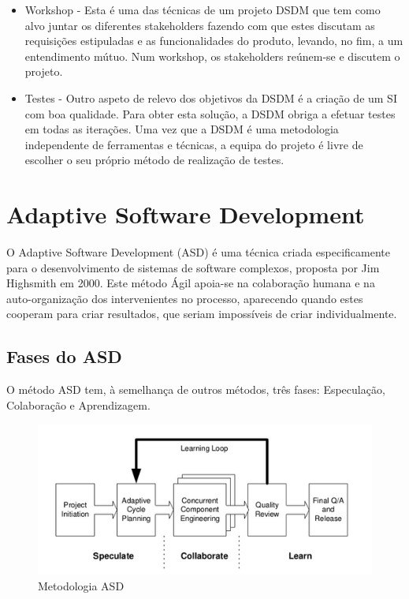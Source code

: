 \begin{itemize}
    \item Workshop - Esta é uma das técnicas de um projeto DSDM que tem como alvo juntar os diferentes stakeholders fazendo com que estes discutam as requisições estipuladas e as funcionalidades do produto, levando, no fim, a um entendimento mútuo. Num workshop, os stakeholders reúnem-se e discutem o projeto.
    \item Testes - Outro aspeto de relevo dos objetivos da DSDM é a criação de um SI com boa qualidade. Para obter esta solução, a DSDM obriga a efetuar testes em todas as iterações. Uma vez que a DSDM é uma metodologia independente de ferramentas e técnicas, a equipa do projeto é livre de escolher o seu próprio método de realização de testes.
    
\end{itemize}

\newpage

\section{Adaptive Software Development}


O Adaptive Software Development (ASD) é uma técnica criada especificamente para o desenvolvimento de sistemas de software complexos, proposta por Jim Highsmith em 2000. Este método Ágil apoia-se na colaboração humana e na auto-organização dos intervenientes no processo, aparecendo quando estes cooperam para criar resultados, que seriam impossíveis de criar individualmente.

\subsection{Fases do ASD}

O método ASD tem, à semelhança de outros métodos, três fases: Especulação, Colaboração e Aprendizagem.

\begin{figure}[H]
    \centering
    \includegraphics[scale=0.8]{Imagens/asd.png}
    \caption{Metodologia ASD}
    \label{fig:asd}
\end{figure}

